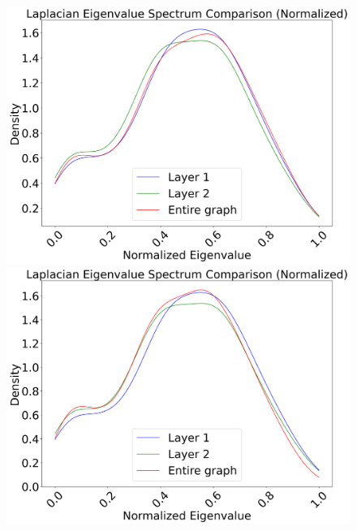 \documentclass[10pt,letterpaper]{article}
\begin{document}
\begin{figure}[h!]
	\centering
	\begin{minipage}[b]{0.25\linewidth}
		\centering
		\includegraphics[width=\textwidth]{figs/fig13.png}
		\subcaption{}
	\end{minipage}
	\hspace{0.5cm}
	\begin{minipage}[b]{0.25\linewidth}
		\centering
		\includegraphics[width=\textwidth]{figs/fig14.png}
		\subcaption{}
	\end{minipage}
	\hspace{0.5cm}
	\begin{minipage}[b]{0.25\linewidth}
		\centering

\end{minipage}
\end{figure}
\end{document}
